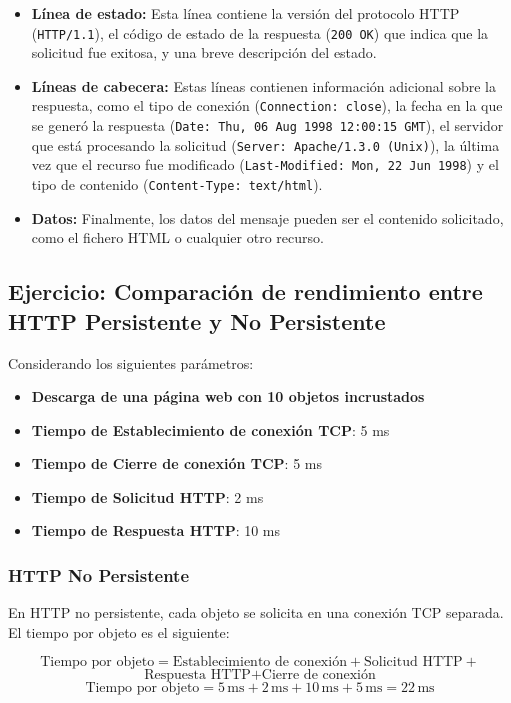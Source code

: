 \documentclass[a4paper,12pt]{article}
\begin{document}
\begin{itemize}
    \item \textbf{Línea de estado:} Esta línea contiene la versión del protocolo HTTP (\texttt{HTTP/1.1}), el código de estado de la respuesta (\texttt{200 OK}) que indica que la solicitud fue exitosa, y una breve descripción del estado.
    \item \textbf{Líneas de cabecera:} Estas líneas contienen información adicional sobre la respuesta, como el tipo de conexión (\texttt{Connection: close}), la fecha en la que se generó la respuesta (\texttt{Date: Thu, 06 Aug 1998 12:00:15 GMT}), el servidor que está procesando la solicitud (\texttt{Server: Apache/1.3.0 (Unix)}), la última vez que el recurso fue modificado (\texttt{Last-Modified: Mon, 22 Jun 1998}) y el tipo de contenido (\texttt{Content-Type: text/html}).
    \item \textbf{Datos:} Finalmente, los datos del mensaje pueden ser el contenido solicitado, como el fichero HTML o cualquier otro recurso.
\end{itemize}

\subsection{Ejercicio: Comparación de rendimiento entre HTTP Persistente y No Persistente}

Considerando los siguientes parámetros:

\begin{itemize}
    \item \textbf{Descarga de una página web con 10 objetos incrustados}
    \item \textbf{Tiempo de Establecimiento de conexión TCP}: 5 ms
    \item \textbf{Tiempo de Cierre de conexión TCP}: 5 ms
    \item \textbf{Tiempo de Solicitud HTTP}: 2 ms
    \item \textbf{Tiempo de Respuesta HTTP}: 10 ms
\end{itemize}
\newpage
\subsubsection{HTTP No Persistente}
En HTTP no persistente, cada objeto se solicita en una conexión TCP separada. El tiempo por objeto es el siguiente:

\[
\text{Tiempo por objeto} = \text{Establecimiento de conexión} + \text{Solicitud HTTP} +
\]
\[
\text{Respuesta HTTP} + \text{Cierre de conexión}
\]
\[
\text{Tiempo por objeto} = 5 \, \text{ms} + 2 \, \text{ms} + 10 \, \text{ms} + 5 \, \text{ms} = 22 \, \text{ms}
\]
\end{document}
